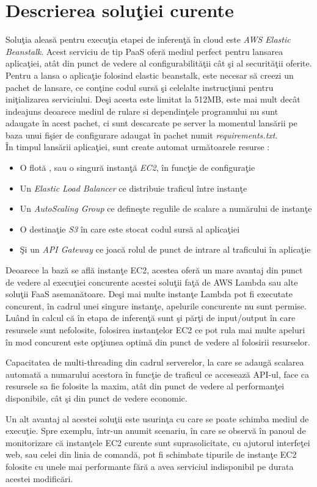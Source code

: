 \documentclass[a4paper,12pt]{report}
\begin{document}
\section{Descrierea soluţiei curente}
\quad Soluţia aleasă pentru execuţia etapei de inferenţă în cloud este \emph{AWS Elastic Beanstalk}. Acest serviciu de tip PaaS oferă mediul perfect pentru lansarea aplicaţiei, atât din punct de vedere al configurabilităţii cât şi al securităţii oferite. 
Pentru a lansa o aplicaţie folosind elastic beanstalk, este necesar să creezi un pachet de lansare, ce conţine codul sursă şi celelalte instrucţiuni pentru iniţializarea serviciului. Deşi acesta este limitat la 512MB, este mai mult decât indeajuns deoarece mediul de rulare si dependinţele programului nu sunt adaugate în acest pachet, ci sunt descarcate pe server la momentul lansării pe baza unui fişier de configurare adaugat în pachet numit \emph{requirements.txt}.\\
În timpul lansării aplicaţiei, sunt create automat următoarele resurse : 
\begin{itemize}
\item O flotă , sau o singură instanţă \emph{EC2}, în funcţie de configuraţie
\item Un \emph{Elastic Load Balancer} ce distribuie traficul între instanţe
\item Un \emph{AutoScaling Group} ce defineşte regulile de scalare a numărului de instanţe
\item O destinaţie \emph{S3} în care este stocat codul sursă al aplicaţiei
\item Şi un \emph{API Gateway} ce joacă rolul de punct de intrare al traficului în aplicaţie
\end{itemize}
\par Deoarece la bază se află instanţe EC2, acestea oferă un mare avantaj din punct de vedere al execuţiei concurente acestei soluţii faţă de AWS Lambda sau alte soluţii FaaS asemanătoare. Deşi mai multe instanţe Lambda pot fi executate concurent, în cadrul unei singure instanţe, apelurile concurente nu sunt permise. Luând în calcul că în etapa de inferenţă sunt şi părţi de input/output în care resursele sunt nefolosite, folosirea instanţelor EC2 ce pot rula mai multe apeluri în mod concurent este opţiunea optimă din punct de vedere al folosirii resurselor. 
\par Capacitatea de multi-threading din cadrul serverelor, la care se adaugă scalarea automată a numarului acestora în funcţie de traficul ce accesează API-ul, face ca resursele sa fie folosite la maxim, atât din punct de vedere al performanţei disponibile, cât şi din punct de vedere economic. 
\par Un alt avantaj al acestei soluţii este usurinţa cu care se poate schimba mediul de execuţie. Spre exemplu, într-un anumit scenariu, în care se observă în panoul de monitorizare că instanţele EC2 curente sunt suprasolicitate, cu ajutorul interfeţei web, sau celei din linia de comandă, pot fi schimbate tipurile de instanţe EC2 folosite cu unele mai performante fără a avea serviciul indisponibil pe durata acestei modificări.
\end{document}
